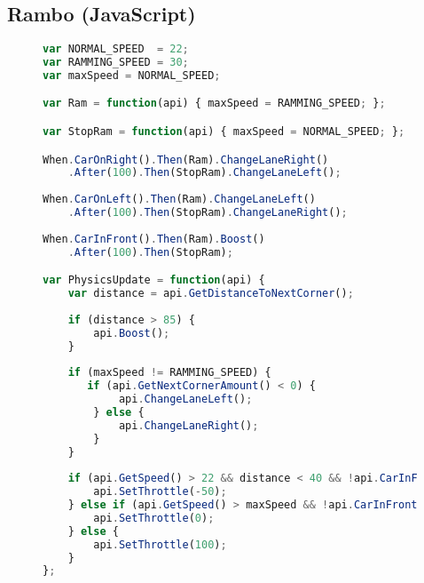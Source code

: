 \subsection{Rambo (JavaScript)}
\begin{figure}[H]
\begin{lstlisting}[language=JavaScript]
var NORMAL_SPEED  = 22;
var RAMMING_SPEED = 30;
var maxSpeed = NORMAL_SPEED; 

var Ram = function(api) { maxSpeed = RAMMING_SPEED; };

var StopRam = function(api) { maxSpeed = NORMAL_SPEED; };

When.CarOnRight().Then(Ram).ChangeLaneRight()
    .After(100).Then(StopRam).ChangeLaneLeft();
    
When.CarOnLeft().Then(Ram).ChangeLaneLeft()
    .After(100).Then(StopRam).ChangeLaneRight();
    
When.CarInFront().Then(Ram).Boost()
    .After(100).Then(StopRam);

var PhysicsUpdate = function(api) { 
    var distance = api.GetDistanceToNextCorner(); 
    
    if (distance > 85) { 
        api.Boost(); 
    }
    
    if (maxSpeed != RAMMING_SPEED) {
       if (api.GetNextCornerAmount() < 0) { 
            api.ChangeLaneLeft(); 
        } else { 
            api.ChangeLaneRight(); 
        } 
    }
    
    if (api.GetSpeed() > 22 && distance < 40 && !api.CarInFront()) { 
        api.SetThrottle(-50); 
    } else if (api.GetSpeed() > maxSpeed && !api.CarInFront()) { 
        api.SetThrottle(0); 
    } else {
        api.SetThrottle(100);
    }
};
\end{lstlisting}
\end{figure}
